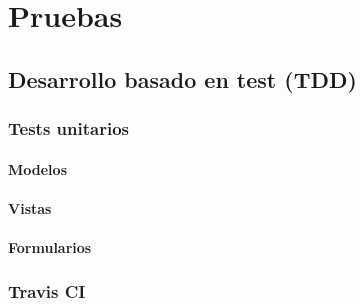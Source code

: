 \chapter{Pruebas}
\label{cap:pruebas}

\section{Desarrollo basado en  test (TDD)}

\subsection{Tests unitarios}

\subsubsection{Modelos}

\subsubsection{Vistas}

\subsubsection{Formularios}

\subsection{Travis CI}
